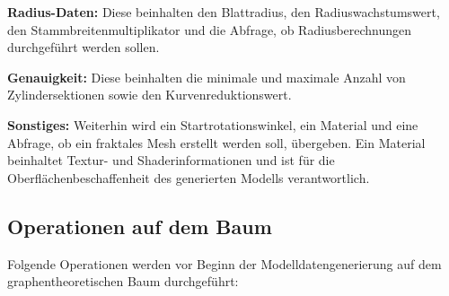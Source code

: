 \begin{description}
	\item \textbf{Radius-Daten:} Diese beinhalten den Blattradius, den Radiuswachstumswert, den Stammbreitenmultiplikator und die Abfrage, ob Radiusberechnungen durchgeführt werden sollen. \\
	
	\item \textbf{Genauigkeit:} Diese beinhalten die minimale und maximale Anzahl von Zylindersektionen sowie den Kurvenreduktionswert. \\
	
	\item \textbf{Sonstiges:} Weiterhin wird ein Startrotationswinkel, ein Material und eine Abfrage, ob ein fraktales Mesh erstellt werden soll, übergeben. Ein Material beinhaltet Textur- und Shaderinformationen und ist für die Oberflächenbeschaffenheit des generierten Modells verantwortlich.
\end{description}

\subsection{Operationen auf dem Baum}

Folgende Operationen werden vor Beginn der Modelldatengenerierung auf dem graphentheoretischen Baum durchgeführt:

